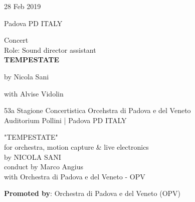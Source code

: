 \documentclass[7pt,a4paper]{article}
\begin{document}
\begin{mdframed}[
    backgroundcolor=entrygray,
    linecolor=entrygray,
    linewidth=0pt,
    innerleftmargin=6pt,
    innerrightmargin=6pt,
    innertopmargin=6pt,
    innerbottommargin=6pt,
    skipabove=0pt,
    skipbelow=0pt
]

\begin{minipage}[t]{0.28\textwidth}

28 Feb 2019

\scriptsize Padova PD ITALY


\end{minipage}
\begin{minipage}[t]{0.68\textwidth}
\small Concert
\\\scriptsize Role: Sound director assistant
\\ \normalsize \textbf{TEMPESTATE}
\par\scriptsize by Nicola Sani
\par\scriptsize with Alvise Vidolin
\vspace{0.25cm}



\small 53a Stagione Concertistica Orcehstra di Padova e del Veneto\\Auditorium Pollini | \scriptsize Padova PD ITALY

\vspace{0.1cm}
\scriptsize

"TEMPESTATE"\\for orchestra, motion capture \& live electronics\\by NICOLA SANI\\conduct by Marco Angius\\with Orchestra di Padova e del Veneto - OPV

\vspace{0.1cm}
\par \textbf{Promoted by}: Orchestra di Padova e del Veneto (OPV)
\end{minipage}
\vspace{0.25cm}
\end{mdframed}
\end{document}
